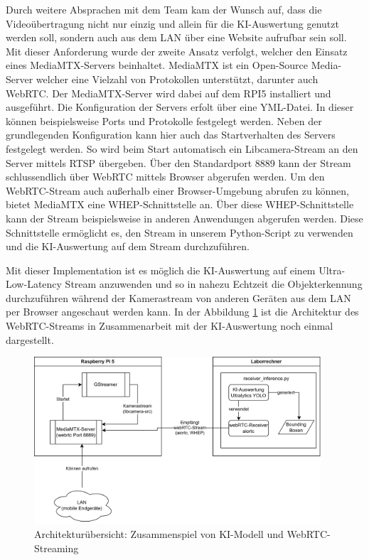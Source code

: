 Durch weitere Absprachen mit dem Team kam der Wunsch auf, dass die Videoübertragung nicht nur einzig und allein für die KI-Auswertung genutzt werden soll, sondern auch aus dem LAN über eine Website aufrufbar sein soll. Mit dieser Anforderung wurde der zweite Ansatz verfolgt, welcher den Einsatz eines MediaMTX-Servers beinhaltet. MediaMTX ist ein Open-Source Media-Server welcher eine Vielzahl von Protokollen unterstützt, darunter auch WebRTC. Der MediaMTX-Server wird dabei auf dem RPI5 installiert und ausgeführt. Die Konfiguration der Servers erfolt über eine YML-Datei.
In dieser können beispielsweise Ports und Protokolle festgelegt werden. Neben der grundlegenden Konfiguration kann hier auch das Startverhalten des Servers festgelegt werden. So wird beim Start automatisch ein Libcamera-Stream an den Server mittels RTSP übergeben. Über den Standardport 8889 kann der Stream schlussendlich über WebRTC mittels Browser abgerufen werden. Um den WebRTC-Stream auch außerhalb einer Browser-Umgebung abrufen zu können, bietet MediaMTX eine WHEP-Schnittstelle an. Über diese WHEP-Schnittstelle kann der Stream beispielsweise in anderen Anwendungen abgerufen werden. Diese Schnittstelle ermöglicht es, den Stream in unserem Python-Script zu verwenden und die KI-Auswertung auf dem Stream durchzuführen. 

Mit dieser Implementation ist es möglich die KI-Auswertung auf einem Ultra-Low-Latency Stream anzuwenden und so in nahezu Echtzeit die Objekterkennung durchzuführen während der Kamerastream von anderen Geräten aus dem LAN per Browser angeschaut werden kann. In der Abbildung \ref{fig:KI-webRTC-Architektur} ist die Architektur des WebRTC-Streams in Zusammenarbeit mit der KI-Auswertung noch einmal dargestellt. 

\begin{figure}[H]
  \centering
  \includegraphics[width=0.95\textwidth]{images/ki-webrtc-arch.png}
  \caption{Architekturübersicht: Zusammenspiel von KI-Modell und WebRTC-Streaming}
  \label{fig:KI-webRTC-Architektur}
\end{figure}
